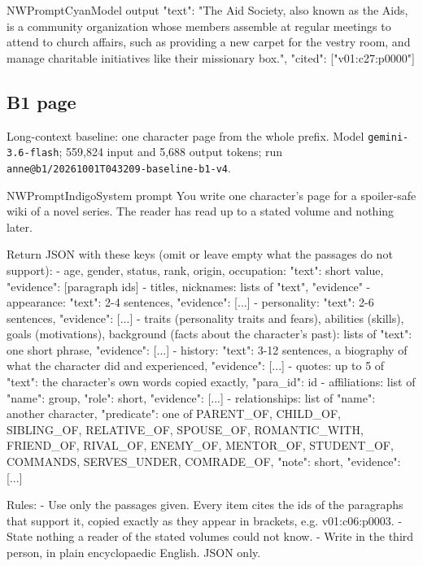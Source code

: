 \begin{nwprompt}{NWPromptCyan}{Model output}
{"text": "The Aid Society, also known as the Aids, is a community organization whose members assemble at regular meetings to attend to church affairs, such as providing a new carpet for the vestry room, and manage charitable initiatives like their missionary box.", "cited": ["v01:c27:p0000"]}
\end{nwprompt}

\subsection*{B1 page}
Long-context baseline: one character page from the whole prefix. Model \texttt{gemini-3.6-flash}; 559,824 input and 5,688 output tokens; run \nolinkurl{anne@b1/20261001T043209-baseline-b1-v4}.

\begin{nwprompt}{NWPromptIndigo}{System prompt}
You write one character's page for a spoiler-safe wiki of a novel series. The reader has
read up to a stated volume and nothing later.

Return JSON with these keys (omit or leave empty what the passages do not support):
- age, gender, status, rank, origin, occupation: {"text": short value, "evidence": [paragraph ids]}
- titles, nicknames: lists of {"text", "evidence"}
- appearance: {"text": 2-4 sentences, "evidence": [...]}
- personality: {"text": 2-6 sentences, "evidence": [...]}
- traits (personality traits and fears), abilities (skills), goals (motivations),
  background (facts about the character's past): lists of {"text": one short phrase, "evidence": [...]}
- history: {"text": 3-12 sentences, a biography of what the character did and experienced, "evidence": [...]}
- quotes: up to 5 of {"text": the character's own words copied exactly, "para_id": id}
- affiliations: list of {"name": group, "role": short, "evidence": [...]}
- relationships: list of {"name": another character, "predicate": one of PARENT_OF, CHILD_OF, SIBLING_OF, RELATIVE_OF, SPOUSE_OF, ROMANTIC_WITH, FRIEND_OF, RIVAL_OF, ENEMY_OF, MENTOR_OF, STUDENT_OF, COMMANDS, SERVES_UNDER, COMRADE_OF, "note": short, "evidence": [...]}

Rules:
- Use only the passages given. Every item cites the ids of the paragraphs that support it, copied
  exactly as they appear in brackets, e.g. v01:c06:p0003.
- State nothing a reader of the stated volumes could not know.
- Write in the third person, in plain encyclopaedic English. JSON only.
\end{nwprompt}

